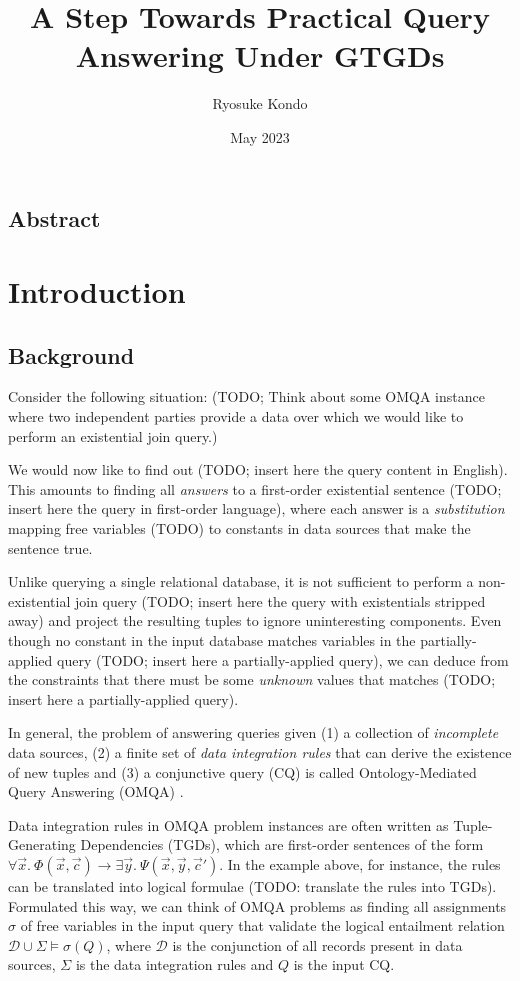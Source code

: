 \documentclass[12pt]{report}
\title{A Step Towards Practical Query Answering Under GTGDs}
\author{Ryosuke Kondo}
\date{May 2023}
\theoremstyle{plain}
\theoremstyle{definition}
\begin{document}
\maketitle

\newpage
\tableofcontents
\newpage

\section*{Abstract}

\newpage
\chapter{Introduction}

\section{Background}

Consider the following situation: (TODO; Think about some OMQA instance where two independent parties provide a data over which we would like to perform an existential join query.)

We would now like to find out (TODO; insert here the query content in English). This amounts to finding all \emph{answers} to a first-order existential sentence (TODO; insert here the query in first-order language), where each answer is a \emph{substitution} mapping free variables (TODO) to constants in data sources that make the sentence true.

Unlike querying a single relational database, it is not sufficient to perform a non-existential join query (TODO; insert here the query with existentials stripped away) and project the resulting tuples to ignore uninteresting components. Even though no constant in the input database matches variables in the partially-applied query (TODO; insert here a partially-applied query), we can deduce from the constraints that there must be some \emph{unknown} values that matches (TODO; insert here a partially-applied query).

In general, the problem of answering queries given (1) a collection of \emph{incomplete} data sources, (2) a finite set of \emph{data integration rules} that can derive the existence of new tuples and (3) a conjunctive query (CQ) is called Ontology-Mediated Query Answering (OMQA) \cite{bienvenu16}.

Data integration rules in OMQA problem instances are often written as Tuple-Generating Dependencies (TGDs), which are first-order sentences of the form $\forall \vec{x}.\ \Phi(\vec{x}, \vec{c}) \rightarrow \exists \vec{y}.\ \Psi(\vec{x}, \vec{y}, \vec{c}')$. In the example above, for instance, the rules can be translated into logical formulae (TODO: translate the rules into TGDs). Formulated this way, we can think of OMQA problems as finding all assignments $\sigma$ of free variables in the input query that validate the logical entailment relation $\mathcal{D} \cup \Sigma \models \sigma(Q)$, where $\mathcal{D}$ is the conjunction of all records present in data sources, $\Sigma$ is the data integration rules and $Q$ is the input CQ.
\end{document}

